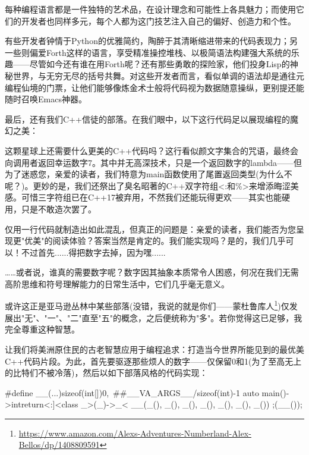 
每种编程语言都是一件独特的艺术品，在设计理念和可能性上各具魅力；而使用它们的开发者也同样多元，每个人都为这门技艺注入自己的偏好、创造力和个性。

有些开发者钟情于Python的优雅简约，陶醉于其清晰缩进带来的代码表现力；另一些则偏爱Forth这样的语言，享受精准操控堆栈、以极简语法构建强大系统的乐趣——尽管如今还有谁在用Forth呢？还有那些勇敢的探险家，他们投身Lisp的神秘世界，与无穷无尽的括号共舞。对这些开发者而言，看似单调的语法却是通往元编程仙境的门票，让他们能够像炼金术士般将代码视为数据随意操纵，更别提还能随时召唤Emacs神器。

最后，还有我们C++信徒的部落。在我们眼中，以下这行代码足以展现编程的魔幻之美：

\begin{cpp}
auto main()->int{return<:]<class _>(_)->_<%
\end{cpp}

这颗星球上还需要什么更美的C++代码吗？这行看似颜文字集合的咒语，最终会向调用者返回幸运数字7。其中并无高深技术，只是一个返回数字的lambda——但为了迷惑您，亲爱的读者，我们特意为main函数使用了尾置返回类型(为什么不呢？)。更妙的是，我们还祭出了臭名昭著的C++双字符组<:和\%>来增添晦涩美感。可惜三字符组已在C++17被弃用，不然我们还能玩得更欢——其实也能硬用，只是不敢造次罢了。

仅用一行代码就制造出如此混乱，但真正的问题是：亲爱的读者，我们能否为您呈现更"优美"的阅读体验？答案当然是肯定的。我们能实现吗？是的，我们几乎可以！不过首先......得把数字去掉，因为嘿......


……或者说，谁真的需要数字呢？数字因其抽象本质常令人困惑，何况在我们无需高阶思维和符号理解能力的日常生活中，它们几乎毫无意义。

或许这正是亚马逊丛林中某些部落(没错，我说的就是你们——蒙杜鲁库人\footnote{\url{https://www.amazon.com/Alexs-Adventures-Numberland-Alex-Bellos/dp/1408809591}})仅发展出"无"、"一"、"二"直至"五"的概念，之后便统称为"多"。若你觉得这已足够，我完全尊重这种智慧。

让我们将美洲原住民的古老智慧应用于编程追求：打造当今世界所能见到的最优美C++代码片段。为此，首先要驱逐那些烦人的数字——仅保留0和1(为了至高无上的比特们不被冷落)，然后以如下部落风格的代码实现：

\begin{cpp}
#define __(...)sizeof(int[]){0,\
                            ##__VA_ARGS__}/sizeof(int)-1
  auto main()->int{return<:]<class _>(_)->_<%
  __(_(), _(), _(), _(), _(), _(), _()) ;}(__());%
\end{cpp}

